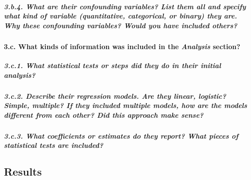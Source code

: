 \documentclass[]{article}
\let\oldparagraph\paragraph
\renewcommand{\paragraph}[1]{\oldparagraph{#1}\mbox{}}
\let\oldsubparagraph\subparagraph
\renewcommand{\subparagraph}[1]{\oldsubparagraph{#1}\mbox{}}
\begin{document}
\hypertarget{b.4.-what-are-their-confounding-variables-list-them-all-and-specify-what-kind-of-variable-quantitative-categorical-or-binary-they-are.-why-these-confounding-variables-would-you-have-included-others}{%
\subparagraph{3.b.4. What are their confounding variables? List them all
and specify what kind of variable (quantitative, categorical, or binary)
they are. Why these confounding variables? Would you have included
others?}\label{b.4.-what-are-their-confounding-variables-list-them-all-and-specify-what-kind-of-variable-quantitative-categorical-or-binary-they-are.-why-these-confounding-variables-would-you-have-included-others}}

\hypertarget{c.-what-kinds-of-information-was-included-in-the-analysis-section}{%
\paragraph{\texorpdfstring{3.c. What kinds of information was included
in the \emph{Analysis}
section?}{3.c. What kinds of information was included in the Analysis section?}}\label{c.-what-kinds-of-information-was-included-in-the-analysis-section}}

\hypertarget{c.1.-what-statistical-tests-or-steps-did-they-do-in-their-initial-analysis}{%
\subparagraph{3.c.1. What statistical tests or steps did they do in
their initial
analysis?}\label{c.1.-what-statistical-tests-or-steps-did-they-do-in-their-initial-analysis}}

\hypertarget{c.2.-describe-their-regression-models.-are-they-linear-logistic-simple-multiple-if-they-included-multiple-models-how-are-the-models-different-from-each-other-did-this-approach-make-sense}{%
\subparagraph{3.c.2. Describe their regression models. Are they linear,
logistic? Simple, multiple? If they included multiple models, how are
the models different from each other? Did this approach make
sense?}\label{c.2.-describe-their-regression-models.-are-they-linear-logistic-simple-multiple-if-they-included-multiple-models-how-are-the-models-different-from-each-other-did-this-approach-make-sense}}

\hypertarget{c.3.-what-coefficients-or-estimates-do-they-report-what-pieces-of-statistical-tests-are-included}{%
\subparagraph{3.c.3. What coefficients or estimates do they report? What
pieces of statistical tests are
included?}\label{c.3.-what-coefficients-or-estimates-do-they-report-what-pieces-of-statistical-tests-are-included}}

\hypertarget{results}{%
\subsection{Results}\label{results}}
\end{document}
